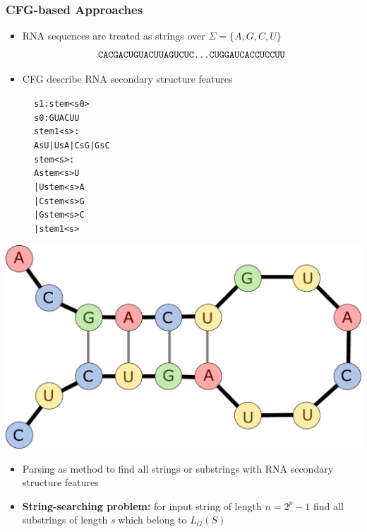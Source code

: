 \documentclass[xcolor=table]{beamer}
\begin{document}
\begin{frame}[fragile] \frametitle{CFG-based Approaches}

    \begin{itemize}
        \item RNA sequences are treated as strings over $\Sigma = \{A, G, C, U\}$
        $$
        \texttt{CACGACUGUACUUAGUCUC\dots CUGGAUCACCUCCUU}
        $$
        \item CFG describe RNA secondary structure features
    \end{itemize}
        \begin{figure}[t]
            \begin{minipage}{0.4\textwidth}
            \footnotesize
            \begin{alltt}
                s1: stem<s0>
                s0: G U A C U U
                stem1<s>:  
                    A s U | U s A | C s G | G s C 
                stem<s>:
                    A stem<s> U
                  | U stem<s> A
                  | C stem<s> G
                  | G stem<s> C
                  | stem1<s>
            \end{alltt}
            \end{minipage}
        \end{figure}

        \vspace{-100pt}\hspace{30pt}\includegraphics[width = 0.4\linewidth]{pic/16s.pdf}\par 
        
        \begin{itemize}
            \item Parsing as method to find all strings or substrings with RNA secondary structure features
            \item \textbf{String-searching problem:} for input string of length $n = 2^p - 1$ find all substrings of length \textit{s} which belong to $L_G(S)$
        \end{itemize}

\end{frame}
\end{document}
